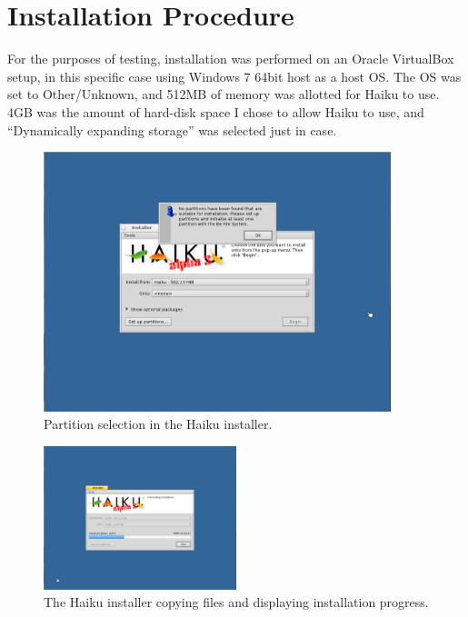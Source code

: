 \documentclass{article}
\begin{document}
\section{Installation Procedure}

For the purposes of testing, installation was performed on an Oracle
VirtualBox setup, in this specific case using Windows 7 64bit host as
a host OS.  The OS was set to Other/Unknown, and 512MB of memory was
allotted for Haiku to use. 4GB was the amount of hard-disk space I chose
to allow Haiku to use, and ``Dynamically expanding storage'' was selected just
in case.

\begin{figure}[h]
\centering
\includegraphics[width=0.9\textwidth]{figs/install-partition.png}
\caption{Partition selection in the Haiku installer.}
\label{fig:install-partition}
\end{figure}

\begin{figure}[h]
\centering
\includegraphics[width=0.5\textwidth]{figs/install-progress.png}
\caption{The Haiku installer copying files and displaying installation
  progress.}
\label{fig:install-progress}
\end{figure}
\end{document}
